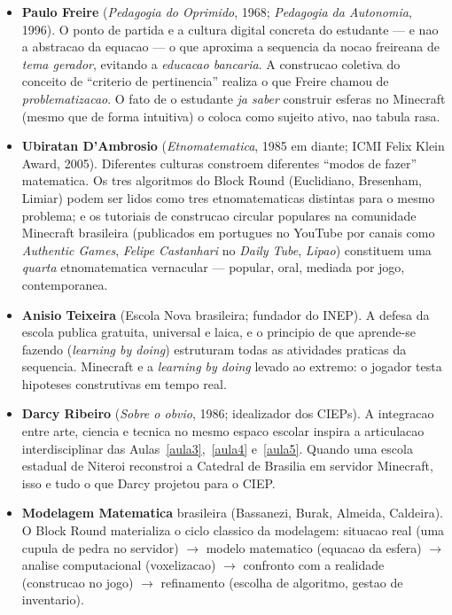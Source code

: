 \documentclass[12pt,a4paper]{scrartcl}
\newcommand{\acc}[1]{\textcolor{accent}{\textbf{#1}}}
\begin{document}
\begin{itemize}[leftmargin=1.3em,itemsep=0.2em,topsep=0.3em]
  \item \acc{Paulo Freire} (\emph{Pedagogia do Oprimido}, 1968; \emph{Pedagogia da Autonomia}, 1996). O ponto de partida e a cultura digital concreta do estudante --- e nao a abstracao da equacao --- o que aproxima a sequencia da nocao freireana de \emph{tema gerador}, evitando a \emph{educacao bancaria}. A construcao coletiva do conceito de \enquote{criterio de pertinencia} realiza o que Freire chamou de \emph{problematizacao}. O fato de o estudante \emph{ja saber} construir esferas no Minecraft (mesmo que de forma intuitiva) o coloca como sujeito ativo, nao tabula rasa.

  \item \acc{Ubiratan D'Ambrosio} (\emph{Etnomatematica}, 1985 em diante; ICMI Felix Klein Award, 2005). Diferentes culturas constroem diferentes \enquote{modos de fazer} matematica. Os tres algoritmos do Block Round (Euclidiano, Bresenham, Limiar) podem ser lidos como tres etnomatematicas distintas para o mesmo problema; e os tutoriais de construcao circular populares na comunidade Minecraft brasileira (publicados em portugues no YouTube por canais como \emph{Authentic Games}, \emph{Felipe Castanhari} no \emph{Daily Tube}, \emph{Lipao}) constituem uma \emph{quarta} etnomatematica vernacular --- popular, oral, mediada por jogo, contemporanea.

  \item \acc{Anisio Teixeira} (Escola Nova brasileira; fundador do INEP). A defesa da escola publica gratuita, universal e laica, e o principio de que aprende-se fazendo (\emph{learning by doing}) estruturam todas as atividades praticas da sequencia. Minecraft e a \emph{learning by doing} levado ao extremo: o jogador testa hipoteses construtivas em tempo real.

  \item \acc{Darcy Ribeiro} (\emph{Sobre o obvio}, 1986; idealizador dos CIEPs). A integracao entre arte, ciencia e tecnica no mesmo espaco escolar inspira a articulacao interdisciplinar das Aulas~\ref{aula3},~\ref{aula4} e~\ref{aula5}. Quando uma escola estadual de Niteroi reconstroi a Catedral de Brasilia em servidor Minecraft, isso e tudo o que Darcy projetou para o CIEP.

  \item \acc{Modelagem Matematica} brasileira (Bassanezi, Burak, Almeida, Caldeira). O Block Round materializa o ciclo classico da modelagem: situacao real (uma cupula de pedra no servidor) $\rightarrow$ modelo matematico (equacao da esfera) $\rightarrow$ analise computacional (voxelizacao) $\rightarrow$ confronto com a realidade (construcao no jogo) $\rightarrow$ refinamento (escolha de algoritmo, gestao de inventario).
\end{itemize}
\end{document}
